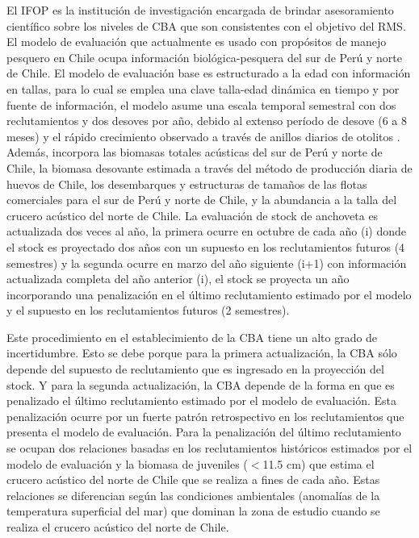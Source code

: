 
El IFOP es la institución de investigación encargada de brindar asesoramiento científico sobre los niveles de CBA que son consistentes con el objetivo del RMS. El modelo de evaluación que actualmente es usado con propósitos de manejo pesquero en Chile ocupa información biológica-pesquera del sur de Perú y norte de Chile. El modelo de evaluación base es estructurado a la edad con información en tallas, para lo cual se emplea una clave talla-edad dinámica en tiempo y por fuente de información, el modelo asume una escala temporal semestral con dos reclutamientos y dos desoves por año, debido al extenso período de desove (6 a 8 meses) y el rápido crecimiento observado a través de anillos diarios de otolitos \citep{cerna2016daily}. Además, incorpora las biomasas totales acústicas del sur de Perú y norte de Chile, la biomasa desovante estimada a través del método de producción diaria de huevos de Chile, los desembarques y estructuras de tamaños de las flotas comerciales para el sur de Perú y norte de Chile, y la abundancia a la talla del crucero acústico del norte de Chile. La evaluación de stock de anchoveta es actualizada dos veces al año, la primera ocurre en octubre de cada año (i) donde el stock es proyectado dos años con un supuesto en los reclutamientos futuros (4 semestres) y la segunda ocurre en marzo del año siguiente (i+1) con información actualizada completa del año anterior (i), el stock se proyecta un año incorporando una penalización en el último reclutamiento estimado por el modelo y el supuesto en los reclutamientos futuros (2 semestres).
\newline

Este procedimiento en el establecimiento de la CBA tiene un alto grado de incertidumbre. Esto se debe porque para la primera actualización, la CBA sólo depende del supuesto de reclutamiento que es ingresado en la proyección del stock. Y para la segunda actualización, la CBA depende de la forma en que es penalizado el último reclutamiento estimado por el modelo de evaluación. Esta penalización ocurre por un fuerte patrón retrospectivo en los reclutamientos que presenta el modelo de evaluación. Para la penalización del último reclutamiento se ocupan dos relaciones basadas en los reclutamientos históricos estimados por el modelo de evaluación y la biomasa de juveniles ($<$11.5 cm) que estima el crucero acústico del norte de Chile que se realiza a fines de cada año. Estas relaciones se diferencian según las condiciones ambientales (anomalías de la temperatura superficial del mar) que dominan la zona de estudio cuando se realiza el crucero acústico del norte de Chile.
\newline

